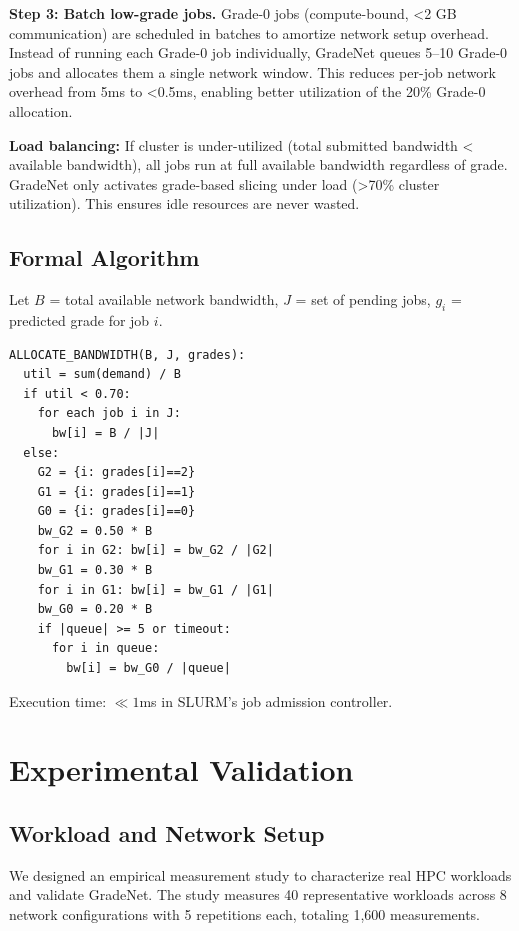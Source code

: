 \documentclass[conference]{IEEEtran}
\begin{document}
\textbf{Step 3: Batch low-grade jobs.} Grade-0 jobs (compute-bound, <2 GB communication) are scheduled in batches to amortize network setup overhead. Instead of running each Grade-0 job individually, GradeNet queues 5--10 Grade-0 jobs and allocates them a single network window. This reduces per-job network overhead from 5ms to <0.5ms, enabling better utilization of the 20\% Grade-0 allocation.

\textbf{Load balancing:} If cluster is under-utilized (total submitted bandwidth < available bandwidth), all jobs run at full available bandwidth regardless of grade. GradeNet only activates grade-based slicing under load (>70\% cluster utilization). This ensures idle resources are never wasted.

\subsection{Formal Algorithm}

Let $B$ = total available network bandwidth, $J$ = set of pending jobs, $g_i$ = predicted grade for job $i$.

\begin{small}
\begin{verbatim}
ALLOCATE_BANDWIDTH(B, J, grades):
  util = sum(demand) / B
  if util < 0.70:
    for each job i in J:
      bw[i] = B / |J|
  else:
    G2 = {i: grades[i]==2}
    G1 = {i: grades[i]==1}
    G0 = {i: grades[i]==0}
    bw_G2 = 0.50 * B
    for i in G2: bw[i] = bw_G2 / |G2|
    bw_G1 = 0.30 * B
    for i in G1: bw[i] = bw_G1 / |G1|
    bw_G0 = 0.20 * B
    if |queue| >= 5 or timeout:
      for i in queue:
        bw[i] = bw_G0 / |queue|
\end{verbatim}
\end{small}

Execution time: $\ll 1$ms in SLURM's job admission controller.

\section{Experimental Validation}

\subsection{Workload and Network Setup}

We designed an empirical measurement study to characterize real HPC workloads and validate GradeNet. The study measures 40 representative workloads across 8 network configurations with 5 repetitions each, totaling 1,600 measurements.
\end{document}
